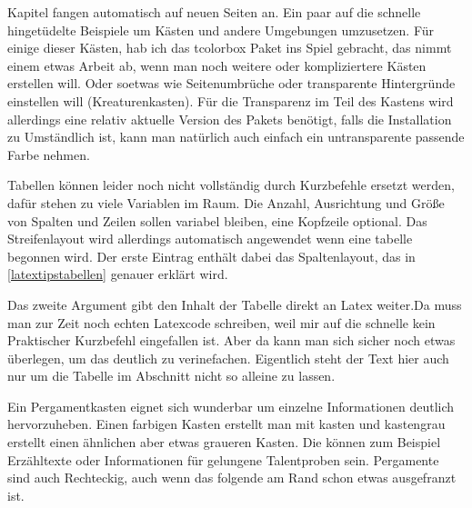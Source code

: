 \documentclass{Ilaris}
\begin{document}
\lipsum[1-4]

Kapitel fangen automatisch auf neuen Seiten an.
Ein paar auf die schnelle hingetüdelte Beispiele um Kästen und andere Umgebungen umzusetzen. Für einige dieser Kästen, hab ich das tcolorbox Paket ins Spiel gebracht, das nimmt einem etwas Arbeit ab, wenn man noch weitere oder kompliziertere Kästen erstellen will. Oder soetwas wie Seitenumbrüche oder transparente Hintergründe einstellen will (Kreaturenkasten). Für die Transparenz im Teil des Kastens wird allerdings eine relativ aktuelle Version des Pakets benötigt, falls die Installation zu Umständlich ist, kann man natürlich auch einfach ein untransparente passende Farbe nehmen.

Tabellen können leider noch nicht vollständig durch Kurzbefehle ersetzt werden, dafür stehen zu viele Variablen im Raum. Die Anzahl, Ausrichtung und Größe von Spalten und Zeilen sollen variabel bleiben, eine Kopfzeile optional. Das Streifenlayout wird allerdings automatisch angewendet wenn eine \gls{tabelle} begonnen wird. Der erste Eintrag enthält dabei das Spaltenlayout, das in \ref{latextipstabellen} genauer erklärt wird.

Das zweite Argument gibt den Inhalt der Tabelle direkt an Latex weiter.Da muss man zur Zeit noch echten Latexcode schreiben, weil mir auf die schnelle kein Praktischer Kurzbefehl eingefallen ist. Aber da kann man sich sicher noch etwas überlegen, um das deutlich zu verinefachen. Eigentlich steht der Text hier auch nur um die Tabelle im Abschnitt nicht so alleine zu lassen.



Ein Pergamentkasten eignet sich wunderbar um einzelne Informationen deutlich hervorzuheben. Einen farbigen Kasten erstellt man mit \gls{kasten} und \gls{kastengrau} erstellt einen ähnlichen aber etwas graueren Kasten. Die können zum Beispiel Erzähltexte oder Informationen für gelungene Talentproben sein. Pergamente sind auch Rechteckig, auch wenn das folgende am Rand schon etwas ausgefranzt ist.

\end{document}
